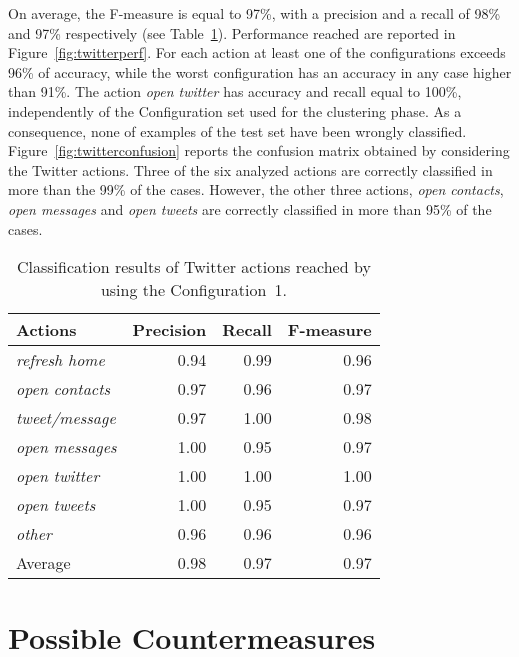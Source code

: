 \documentclass{acm_proc_article-sp}
\begin{document}
On average, the F-measure is equal 
to 97\%, with a precision and a recall of 98\% and 97\% respectively (see 
Table~\ref{tab:twitterreport}). 
Performance reached are reported in Figure~\ref{fig:twitterperf}. 
For each action at least one of the configurations exceeds 96\% of 
accuracy, while the worst configuration has an accuracy in any case higher than 91\%.
The action \emph{open twitter} has accuracy and recall equal to  
100\%, independently of the Configuration set used for the clustering phase. As a 
consequence, none of examples of the test set have been wrongly classified. 
Figure~\ref{fig:twitterconfusion} reports the confusion matrix obtained by 
considering the Twitter actions.
Three of the six analyzed actions are correctly classified in more than the 99\% of the cases. 
However, the other three actions, \emph{open contacts}, \emph{open messages} and \emph{open tweets} are correctly classified in more than 95\% of the cases.


\begin{table}[t]
\begin{center} {\begin{tabular}{|l|r|r|r|}
  \hline
\textbf{Actions} & \textbf{Precision}& \textbf{Recall} & \textbf{F-measure}\\
  \hline
\emph{refresh home} & 0.94 & 0.99 & 0.96 \\ 
\emph{open contacts} & 0.97 & 0.96 & 0.97 \\ 
\emph{tweet/message} & 0.97 & 1.00 & 0.98 \\ 
\emph{open messages} & 1.00 & 0.95 & 0.97 \\ 
\emph{open twitter} & 1.00 & 1.00 & 1.00 \\ 
\emph{open tweets} & 1.00 & 0.95 & 0.97 \\
\emph{other} & 0.96 & 0.96 & 0.96 \\ 
\hline
Average & 0.98 & 0.97 & 0.97 \\  
  \hline
\end{tabular} }
\end{center}
\caption{
Classification results of Twitter actions reached 
by using the {Configuration~1}.}
\label{tab:twitterreport}
\end{table}





 





\section{Possible Countermeasures}
\label{Countermeasures}
\end{document}
